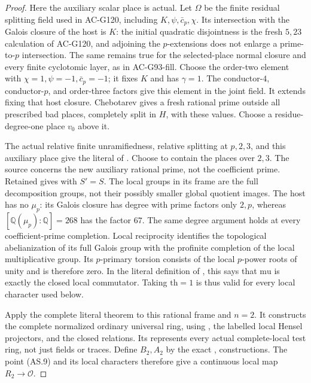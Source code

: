 \begin{proof}
Here the auxiliary scalar place is actual.  Let \(\Omega\)
be the finite residual splitting field used in AC-G120,
including \(K,\psi,\bar c_p,\chi\).
Its intersection with the Galois closure of the host is \(K\):
the initial quadratic disjointness is the fresh \(5,23\)
calculation of AC-G120, and adjoining the \(p\)-extensions
does not enlarge a prime-to-\(p\) intersection.
The same remains true for the selected-place normal closure
and every finite cyclotomic layer, as in AC-G93-fill.
Choose the order-two element with
\(\chi=1,\psi=-1,\bar c_p=-1\); it fixes \(K\) and has
\(\gamma=1\).  The conductor-\(4\), conductor-\(p\), and
order-three factors give this element in the joint field.
It extends fixing that host closure.  Chebotarev gives a fresh
rational prime outside all prescribed bad places, completely
split in \(H\), with these values.
Choose a residue-degree-one place \(v_0\) above it.

The actual relative finite unramifiedness, relative splitting
at \(p,2,3\), and this auxiliary place give the literal
 of .
Choose  to contain the places over \(2,3\).
The source  concerns the new auxiliary rational
prime, not the coefficient prime.
Retained  gives  with \(S'=S\).
The local groups in its frame are the full decomposition
groups, not their possibly smaller global quotient images.
The host has no \(\mu_p\): its Galois closure has degree
with prime factors only \(2,p\), whereas \([\mathbb Q(\mu_p):
\mathbb Q]=268\) has the factor \(67\).
The same degree argument holds at every coefficient-prime
completion.  Local reciprocity identifies the topological
abelianization of its full Galois group with the profinite
completion of the local multiplicative group.  Its \(p\)-primary
torsion consists of the local \(p\)-power roots of unity and is
therefore zero.  In the literal definition of
, this says that \(\mathrm{mu}\) is exactly
the closed local commutator.  Taking \(\mathrm{th}=1\) is
thus valid for every local character used below.

Apply the complete literal  theorem to this
rational frame and \(n=2\).  It constructs the complete
normalized ordinary universal ring, using ,
the labelled local Hensel projectors, and the closed relations.
Its  represents every actual complete-local
test ring, not just fields or traces.  Define \(B_2,A_2\)
by the exact ,  constructions.
The point (AS.9) and its local characters therefore give a
continuous local map \(R_2\to\mathcal O\).


\end{proof}
